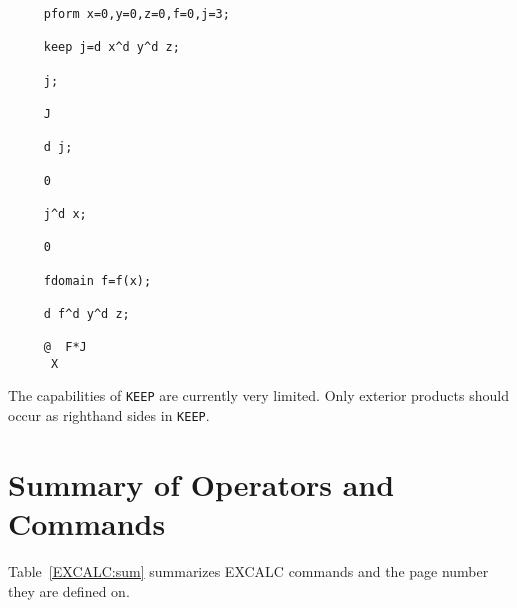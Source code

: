 \example{}

\begin{verbatim}
     pform x=0,y=0,z=0,f=0,j=3;

     keep j=d x^d y^d z;

     j;

     J

     d j;

     0

     j^d x;

     0

     fdomain f=f(x);

     d f^d y^d z;

     @  F*J
      X
\end{verbatim}

The capabilities of {\tt KEEP} are currently very limited.  Only exterior
products should occur as righthand sides in {\tt KEEP}.


\section{Summary of Operators and Commands}
Table~\ref{EXCALC:sum} summarizes EXCALC commands and the page number they are
defined on.

